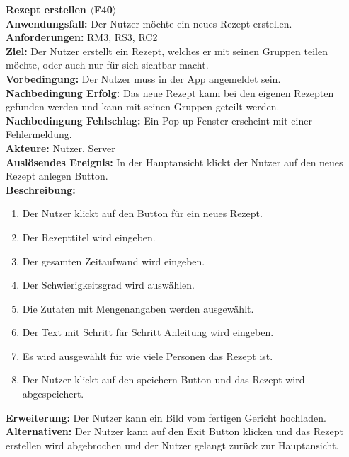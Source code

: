 \documentclass[parskip=full]{scrartcl}
\begin{document}
\textbf{Rezept erstellen $\langle$F40$\rangle$}\\
\textbf{Anwendungsfall:} Der Nutzer möchte ein neues Rezept erstellen.\\
\textbf{Anforderungen:} RM3, RS3, RC2\\
\textbf{Ziel:} Der Nutzer erstellt ein Rezept, welches er mit seinen Gruppen teilen möchte, oder auch nur für sich sichtbar macht.\\
\textbf{Vorbedingung:} Der Nutzer muss in der App angemeldet sein.\\
\textbf{Nachbedingung Erfolg:} Das neue Rezept kann bei den eigenen Rezepten gefunden werden und kann mit seinen Gruppen geteilt werden.\\
\textbf{Nachbedingung Fehlschlag:} Ein Pop-up-Fenster erscheint mit einer Fehlermeldung.\\
\textbf{Akteure:} Nutzer, Server\\
\textbf{Auslösendes Ereignis:} In der Hauptansicht klickt der Nutzer auf den neues Rezept anlegen Button.\\
\textbf{Beschreibung:}
\begin{enumerate}
    \item Der Nutzer klickt auf den Button für ein neues Rezept.
    \item Der Rezepttitel wird eingeben.
    \item Der gesamten Zeitaufwand wird eingeben.
    \item Der Schwierigkeitsgrad wird auswählen.
    \item Die Zutaten mit Mengenangaben werden ausgewählt.
    \item Der Text mit Schritt für Schritt Anleitung wird eingeben.
    \item Es wird ausgewählt für wie viele Personen das Rezept ist.
    \item Der Nutzer klickt auf den speichern Button und das Rezept wird abgespeichert.
\end{enumerate}
\textbf{Erweiterung:} Der Nutzer kann ein Bild vom fertigen Gericht hochladen.\\
\textbf{Alternativen:} Der Nutzer kann auf den Exit Button klicken und das Rezept erstellen wird abgebrochen und der Nutzer gelangt zurück zur Hauptansicht.\\
\newpage
\end{document}
